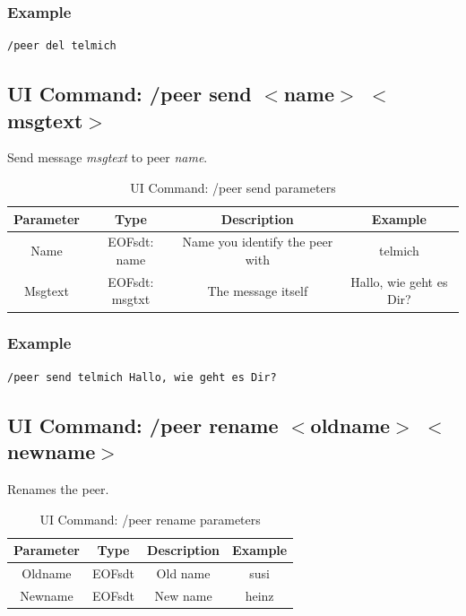 \subsubsection{Example}
\begin{verbatim}
/peer del telmich
\end{verbatim}
\subsection{UI Command: /peer send $<$name$>$ $<$msgtext$>$}
Send message \textit{msgtext} to peer \textit{name}.

%
\begin{longtable}{|c|c|c|c|}
\caption{UI Command: /peer send parameters}\\
\hline
\textbf{Parameter} & \textbf{Type} & \textbf{Description} & \textbf{Example}\\
\hline
Name & EOFsdt: name & Name you identify the peer with & telmich\\
\hline
Msgtext & EOFsdt: msgtxt & The message itself & Hallo, wie geht es Dir?\\
\hline
\end{longtable}

\subsubsection{Example}
\begin{verbatim}
/peer send telmich Hallo, wie geht es Dir?
\end{verbatim}
\subsection{UI Command: /peer rename $<$oldname$>$ $<$newname$>$}
Renames the peer.
%
\begin{longtable}{|c|c|c|c|}
\caption{UI Command: /peer rename parameters}\\
\hline
\textbf{Parameter} & \textbf{Type} & \textbf{Description} & \textbf{Example}\\
\hline
Oldname & EOFsdt & Old name & susi\\
\hline
Newname & EOFsdt & New name & heinz\\
\hline
\end{longtable}


